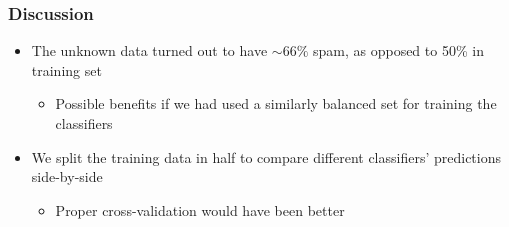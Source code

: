 \documentclass{beamer}
\begin{document}
\frame
{
    \frametitle{Discussion}
    \begin{itemize}
        \item The unknown data turned out to have $\sim66\%$ spam, as opposed to 50\% in training set
        \begin{itemize}
            \item Possible benefits if we had used a similarly balanced set for training the classifiers
        \end{itemize}
        \item We split the training data in half to compare different classifiers' predictions side-by-side
        \begin{itemize}
            \item Proper cross-validation would have been better
        \end{itemize}
    \end{itemize}
}
\end{document}
